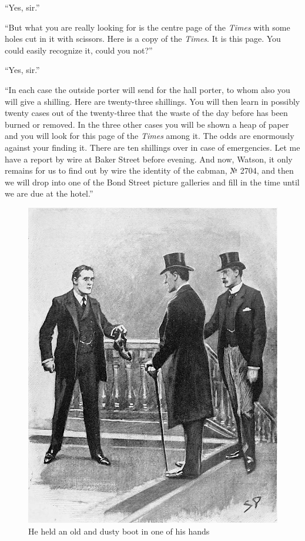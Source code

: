 \documentclass[paper=5.5in:8.5in,BCOR=7mm,twoside,DIV=calc,12pt,usegeometry,openany,chapterprefix,endperiod,headings=big]{scrbook} %
\begin{document}
\enquote{Yes, sir.}

\enquote{But what you are really looking for is the centre page of the \textit{Times} with some holes cut in it with scissors. Here is a copy of the \textit{Times}. It is this page. You could easily recognize it, could you not?}

\enquote{Yes, sir.}

\enquote{In each case the outside porter will send for the hall porter, to whom also you will give a shilling. Here are twenty-three shillings. You will then learn in possibly twenty cases out of the twenty-three that the waste of the day before has been burned or removed. In the three other cases you will be shown a heap of paper and you will look for this page of the \textit{Times} among it. The odds are enormously against your finding it. There are ten shillings over in case of emergencies. Let me have a report by wire at Baker Street before evening. And now, Watson, it only remains for us to find out by wire the identity of 
the cabman, № 2704, and then we will drop into one of the Bond Street picture galleries and fill in the time until we are due at the hotel.}

\clearpage
\vfill
\begin{figure}[ph!]
\centering
\includegraphics[width=\linewidth]{05_oldboot}
\caption{He held an old and dusty boot in one of his hands}
\end{figure}
\vfill
\thispagestyle{empty}
\clearpage
\end{document}
